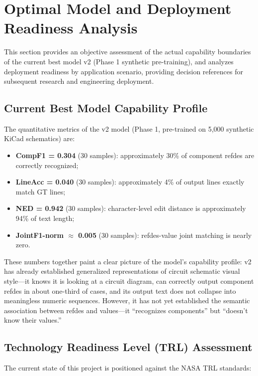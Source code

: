 \section{Optimal Model and Deployment Readiness Analysis}

This section provides an objective assessment of the actual capability boundaries of the current best model v2 (Phase 1 synthetic pre-training), and analyzes deployment readiness by application scenario, providing decision references for subsequent research and engineering deployment.

\subsection{Current Best Model Capability Profile}

The quantitative metrics of the v2 model (Phase 1, pre-trained on 5,000 synthetic KiCad schematics) are:
\begin{itemize}[nosep]
    \item \textbf{CompF1 = 0.304} (30 samples): approximately 30\% of component refdes are correctly recognized;
    \item \textbf{LineAcc = 0.040} (30 samples): approximately 4\% of output lines exactly match GT lines;
    \item \textbf{NED = 0.942} (30 samples): character-level edit distance is approximately 94\% of text length;
    \item \textbf{JointF1-norm $\approx$ 0.005} (30 samples): refdes-value joint matching is nearly zero.
\end{itemize}

These numbers together paint a clear picture of the model's capability profile: v2 has already established generalized representations of circuit schematic visual style---it knows it is looking at a circuit diagram, can correctly output component refdes in about one-third of cases, and its output text does not collapse into meaningless numeric sequences. However, it has not yet established the semantic association between refdes and values---it ``recognizes components'' but ``doesn't know their values.''

\subsection{Technology Readiness Level (TRL) Assessment}

The current state of this project is positioned against the NASA TRL standards:

